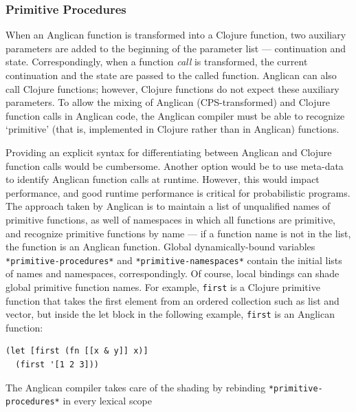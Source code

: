 \documentclass[preprint]{sigplanconf}
\begin{document}
\iftoggle{full}{%

}{%
}%

\subsubsection{Primitive Procedures}
\label{seq:primitive}

When an Anglican function is transformed into a Clojure
function\iftoggle{full}{ by \texttt{fn-cps}}{}, two auxiliary parameters are added to the
beginning of the parameter list --- continuation and state.
Correspondingly, when a function \textit{call} is
transformed\iftoggle{full}{ (by \texttt{cps-of-application} or
\texttt{cps-of-apply})}{}, the
current continuation and the state are passed to the called
function. Anglican can also call Clojure functions; however,
Clojure functions do not expect these auxiliary parameters.
To allow the mixing of Anglican (CPS-transformed) and Clojure
function calls in Anglican code, the Anglican compiler must be
able to recognize `primitive' (that is, implemented in Clojure
rather than in Anglican) functions.

Providing an explicit syntax for differentiating between
Anglican and Clojure function calls would be cumbersome. Another
option would be to use meta-data to identify Anglican function
calls at runtime. However, this would impact performance, and
good runtime performance is critical for probabilistic
programs. The approach taken by Anglican is to maintain a list
of unqualified names of primitive functions, as well of
namespaces in which all functions are primitive, and recognize
primitive functions by name --- if a function name is not in the
list, the function is an Anglican function. Global dynamically-bound 
variables \texttt{*primitive-procedures*} and
\texttt{*primitive-namespaces*} contain the initial lists of
names and namespaces, correspondingly. Of course, local bindings
can shade global primitive function names. For example,
\texttt{first} is a Clojure primitive function that takes the first
element from an ordered collection such as list and vector,
but inside the let block in the
following example, \texttt{first} is an Anglican function:
\begin{lstlisting}[style=default]
(let [first (fn [[x & y]] x)]
  (first '[1 2 3]))
\end{lstlisting}
The Anglican compiler takes care of the shading by rebinding
\texttt{*primitive-procedures*} in every lexical
scope\iftoggle{full}{ (\texttt{fn-cps}, \texttt{cps-of-let}). Macro
\texttt{shading-primitive-procedures} automates the shading}{.}
\end{document}

